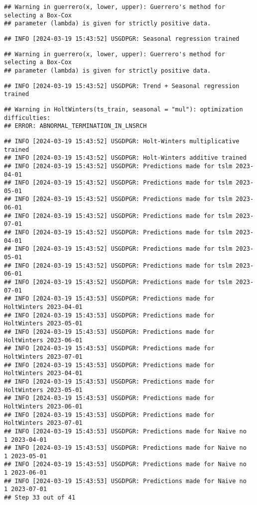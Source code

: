 \documentclass[
]{article}
\begin{document}
\begin{verbatim}
## Warning in guerrero(x, lower, upper): Guerrero's method for selecting a Box-Cox
## parameter (lambda) is given for strictly positive data.
\end{verbatim}

\begin{verbatim}
## INFO [2024-03-19 15:43:52] USGDPGR: Seasonal regression trained
\end{verbatim}

\begin{verbatim}
## Warning in guerrero(x, lower, upper): Guerrero's method for selecting a Box-Cox
## parameter (lambda) is given for strictly positive data.
\end{verbatim}

\begin{verbatim}
## INFO [2024-03-19 15:43:52] USGDPGR: Trend + Seasonal regression trained
\end{verbatim}

\begin{verbatim}
## Warning in HoltWinters(ts_train, seasonal = "mul"): optimization difficulties:
## ERROR: ABNORMAL_TERMINATION_IN_LNSRCH
\end{verbatim}

\begin{verbatim}
## INFO [2024-03-19 15:43:52] USGDPGR: Holt-Winters multiplicative trained
## INFO [2024-03-19 15:43:52] USGDPGR: Holt-Winters additive trained
## INFO [2024-03-19 15:43:52] USGDPGR: Predictions made for tslm 2023-04-01
## INFO [2024-03-19 15:43:52] USGDPGR: Predictions made for tslm 2023-05-01
## INFO [2024-03-19 15:43:52] USGDPGR: Predictions made for tslm 2023-06-01
## INFO [2024-03-19 15:43:52] USGDPGR: Predictions made for tslm 2023-07-01
## INFO [2024-03-19 15:43:52] USGDPGR: Predictions made for tslm 2023-04-01
## INFO [2024-03-19 15:43:52] USGDPGR: Predictions made for tslm 2023-05-01
## INFO [2024-03-19 15:43:52] USGDPGR: Predictions made for tslm 2023-06-01
## INFO [2024-03-19 15:43:52] USGDPGR: Predictions made for tslm 2023-07-01
## INFO [2024-03-19 15:43:53] USGDPGR: Predictions made for HoltWinters 2023-04-01
## INFO [2024-03-19 15:43:53] USGDPGR: Predictions made for HoltWinters 2023-05-01
## INFO [2024-03-19 15:43:53] USGDPGR: Predictions made for HoltWinters 2023-06-01
## INFO [2024-03-19 15:43:53] USGDPGR: Predictions made for HoltWinters 2023-07-01
## INFO [2024-03-19 15:43:53] USGDPGR: Predictions made for HoltWinters 2023-04-01
## INFO [2024-03-19 15:43:53] USGDPGR: Predictions made for HoltWinters 2023-05-01
## INFO [2024-03-19 15:43:53] USGDPGR: Predictions made for HoltWinters 2023-06-01
## INFO [2024-03-19 15:43:53] USGDPGR: Predictions made for HoltWinters 2023-07-01
## INFO [2024-03-19 15:43:53] USGDPGR: Predictions made for Naive no  1 2023-04-01
## INFO [2024-03-19 15:43:53] USGDPGR: Predictions made for Naive no  1 2023-05-01
## INFO [2024-03-19 15:43:53] USGDPGR: Predictions made for Naive no  1 2023-06-01
## INFO [2024-03-19 15:43:53] USGDPGR: Predictions made for Naive no  1 2023-07-01
## Step 33 out of 41
\end{verbatim}
\end{document}
